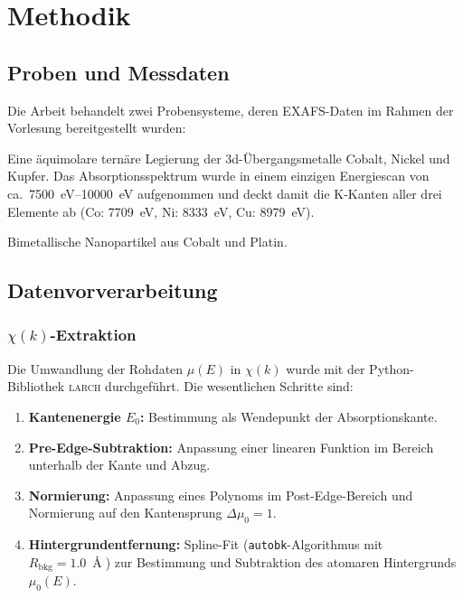 \chapter{Methodik}
\label{ch:methodik}

\section{Proben und Messdaten}

Die Arbeit behandelt zwei Probensysteme, deren EXAFS-Daten im Rahmen
der Vorlesung bereitgestellt wurden:

\begin{description}[style=nextline]
  \item[Probe~1: \TODO{CoNiCu}-Mittelentropielegierung (MEA)]
    Eine äquimolare ternäre Legierung der 3d-Übergangsmetalle Cobalt,
    Nickel und Kupfer.
    Das Absorptionsspektrum wurde in einem einzigen Energiescan von
    ca.\ \SIrange{7500}{10000}{\electronvolt} aufgenommen und deckt
    damit die K-Kanten aller drei Elemente ab
    (Co: \SI{7709}{\electronvolt}, Ni: \SI{8333}{\electronvolt},
    Cu: \SI{8979}{\electronvolt}).
  \item[Probe~2: \TODO{CoPt}-Nanopartikel]
    Bimetallische Nanopartikel aus Cobalt und Platin.
\end{description}

\section{Datenvorverarbeitung}
\label{sec:datenvorverarbeitung}

\subsection{$\chi(k)$-Extraktion}

Die Umwandlung der Rohdaten $\mu(E)$ in $\chi(k)$ wurde mit der
Python-Bibliothek \textsc{larch} \cite{Newville2013} durchgeführt.
Die wesentlichen Schritte sind:

\begin{enumerate}
  \item \textbf{Kantenenergie $E_0$:} Bestimmung als Wendepunkt
        der Absorptionskante.
  \item \textbf{Pre-Edge-Subtraktion:} Anpassung einer linearen
        Funktion im Bereich unterhalb der Kante und Abzug.
  \item \textbf{Normierung:} Anpassung eines Polynoms im
        Post-Edge-Bereich und Normierung auf den Kantensprung
        $\Delta\mu_0 = 1$.
  \item \textbf{Hintergrundentfernung:} Spline-Fit
        (\texttt{autobk}-Algorithmus mit $R_{\text{bkg}} = \SI{1.0}{\Angstrom}$)
        zur Bestimmung und Subtraktion des atomaren Hintergrunds
        $\mu_0(E)$.
\end{enumerate}

